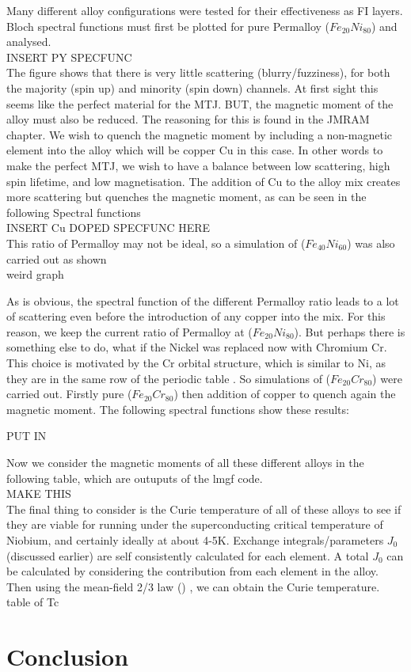 \documentclass[12pt]{article}
\begin{document}
Many different alloy configurations were tested for their effectiveness as FI layers. Bloch spectral functions must first be plotted for pure Permalloy ($Fe_{20}Ni_{80}$) and analysed. \\
INSERT PY SPECFUNC
\\
The figure shows that there is very little scattering (blurry/fuzziness), for both the majority (spin up) and minority (spin down) channels. At first sight this seems like the perfect material for the MTJ. BUT, the magnetic moment of the alloy must also be reduced. The reasoning for this is found in the JMRAM chapter. We wish to quench the magnetic moment by including a non-magnetic element into the alloy which will be copper Cu in this case. In other words to make the perfect MTJ, we wish to have a balance between low scattering, high spin lifetime, and low magnetisation. The addition of Cu to the alloy mix creates more scattering but quenches the magnetic moment, as can be seen in the following Spectral functions 
\\
INSERT Cu DOPED SPECFUNC HERE
\\

This ratio of Permalloy may not be ideal, so a simulation of ($Fe_{40}Ni_{60}$) was also carried out as shown
\\weird graph 

As is obvious, the spectral function of the different Permalloy ratio leads to a lot of scattering even before the introduction of any copper into the mix. For this reason, we keep the current ratio of Permalloy at ($Fe_{20}Ni_{80}$). But perhaps there is something else to do, what if the Nickel was replaced now with Chromium Cr. This choice is motivated by the Cr orbital structure, which is similar to Ni, as they are in the same row of the periodic table \cite{ashcroft}. So simulations of ($Fe_{20}Cr_{80}$) were carried out. Firstly pure ($Fe_{20}Cr_{80}$) then addition of copper to quench again the magnetic moment. The following spectral functions show these results:

PUT IN

Now we consider the magnetic moments of all these different alloys in the following table, which are outuputs of the lmgf code.
\\ 
MAKE THIS
\\

The final thing to consider is the Curie temperature of all of these alloys to see if they are viable for running under the superconducting critical temperature of Niobium, and certainly ideally at about 4-5K. Exchange integrals/parameters $J_0$ (discussed earlier) are self consistently calculated for each element. A total $J_0$ can be calculated by considering the contribution from each element in the alloy. Then using the mean-field 2/3 law () , we can obtain the Curie temperature. 
\\
table of Tc
\\

\section{Conclusion}



\clearpage
\printbibliography
\end{document}
